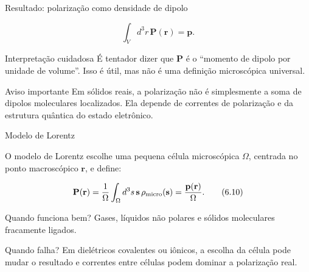 \documentclass[aspectratio=169]{beamer}
\begin{document}
\begin{frame}{Resultado: polarização como densidade de dipolo}

\begin{eqbox}
\begin{equation}
\int_V d^3r\,\mathbf P(\mathbf r)
=
\mathbf p.
\tag{6.9}
\label{eq:P-integral-dipolo}
\end{equation}
\end{eqbox}

\begin{mybox}{Interpretação cuidadosa}
É tentador dizer que \(\mathbf P\) é o ``momento de dipolo por unidade de
volume''. Isso é útil, mas não é uma definição microscópica universal.
\end{mybox}

\begin{alertblock}{Aviso importante}
Em sólidos reais, a polarização não é simplesmente a soma de dipolos moleculares
localizados. Ela depende de correntes de polarização e da estrutura quântica do
estado eletrônico.
\end{alertblock}

\end{frame}

\begin{frame}{Modelo de Lorentz}

\small

O modelo de Lorentz escolhe uma pequena célula microscópica \(\Omega\), centrada
no ponto macroscópico \(\mathbf r\), e define:

\begin{eqbox}
\begin{equation}
\mathbf P(\mathbf r)
=
\frac{1}{\Omega}
\int_{\Omega} d^3s\,
\mathbf s\,\rho_{\rm micro}(\mathbf s)
=
\frac{\mathbf p(\mathbf r)}{\Omega}.
\tag{6.10}
\label{eq:lorentz-P}
\end{equation}
\end{eqbox}

\begin{mybox}{Quando funciona bem?}
Gases, líquidos não polares e sólidos moleculares fracamente ligados.
\end{mybox}

\begin{alertblock}{Quando falha?}
Em dielétricos covalentes ou iônicos, a escolha da célula pode mudar o resultado
e correntes entre células podem dominar a polarização real.
\end{alertblock}

\end{frame}
\end{document}
